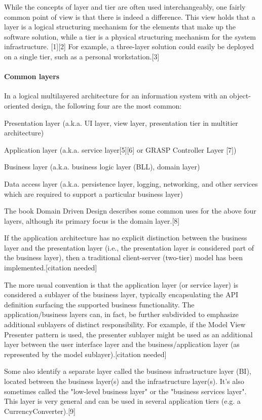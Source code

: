 \documentclass{book}
\begin{document}
While the concepts of layer and tier are often used interchangeably, one fairly common point of view is that there is indeed a difference.
This view holds that a layer is a logical structuring mechanism for the elements that make up the software solution, while a tier is a physical structuring mechanism for the system infrastructure.
[1][2] For example, a three-layer solution could easily be deployed on a single tier, such as a personal workstation.[3]

\paragraph{Common layers}

In a logical multilayered architecture for an information system with an object-oriented design, the following four are the most common:

    Presentation layer (a.k.a. UI layer, view layer, presentation tier in multitier architecture)

    Application layer (a.k.a. service layer[5][6] or GRASP Controller Layer [7])

    Business layer (a.k.a. business logic layer (BLL), domain layer)

    Data access layer (a.k.a. persistence layer, logging, networking, and other services which are required to support a particular business layer)

The book Domain Driven Design describes some common uses for the above four layers, although its primary focus is the domain layer.[8]

If the application architecture has no explicit distinction between the business layer and the presentation layer (i.e., the presentation layer is considered part of the business layer),
then a traditional client-server (two-tier) model has been implemented.[citation needed]

The more usual convention is that the application layer (or service layer) is considered a sublayer of the business layer,
typically encapsulating the API definition surfacing the supported business functionality. The application/business layers can, in fact,
be further subdivided to emphasize additional sublayers of distinct responsibility. For example, if the Model View Presenter pattern is used,
the presenter sublayer might be used as an additional layer between the user interface layer and the business/application layer (as represented by the model sublayer).[citation needed]

Some also identify a separate layer called the business infrastructure layer (BI), located between the business layer(s) and the infrastructure layer(s).
It's also sometimes called the "low-level business layer" or the "business services layer".
This layer is very general and can be used in several application tiers (e.g. a CurrencyConverter).[9]
\end{document}
